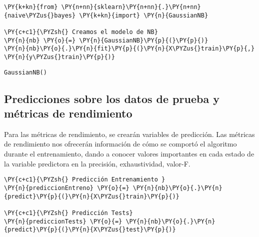    \begin{tcolorbox}[breakable, size=fbox, boxrule=1pt, pad at break*=1mm,colback=cellbackground, colframe=cellborder]
\begin{Verbatim}[commandchars=\\\{\}]
\PY{k+kn}{from} \PY{n+nn}{sklearn}\PY{n+nn}{.}\PY{n+nn}{naive\PYZus{}bayes} \PY{k+kn}{import} \PY{n}{GaussianNB}

\PY{c+c1}{\PYZsh{} Creamos el modelo de NB}
\PY{n}{nb} \PY{o}{=} \PY{n}{GaussianNB}\PY{p}{(}\PY{p}{)}
\PY{n}{nb}\PY{o}{.}\PY{n}{fit}\PY{p}{(}\PY{n}{X\PYZus{}train}\PY{p}{,} \PY{n}{y\PYZus{}train}\PY{p}{)}
\end{Verbatim}
\end{tcolorbox}

            \begin{tcolorbox}[breakable, size=fbox, boxrule=.5pt, pad at break*=1mm, opacityfill=0]
\begin{Verbatim}[commandchars=\\\{\}]
GaussianNB()
\end{Verbatim}
\end{tcolorbox}
        
    \hypertarget{predicciones-sobre-los-datos-de-prueba-y-muxe9tricas-de-rendimiento}{%
\subsection{Predicciones sobre los datos de prueba y métricas de rendimiento}\label{NB:predicciones-sobre-los-datos-de-prueba-y-muxe9tricas-de-rendimiento}}

	Para las métricas de rendimiento, se crearán variables de predicción. Las métricas de rendimiento nos ofrecerán información de cómo se comportó el algoritmo durante el entrenamiento, dando a conocer valores importantes en cada estado  de la variable predictora en la precisión, exhaustividad, valor-F.

    \begin{tcolorbox}[breakable, size=fbox, boxrule=1pt, pad at break*=1mm,colback=cellbackground, colframe=cellborder]
\begin{Verbatim}[commandchars=\\\{\}]
\PY{c+c1}{\PYZsh{} Predicción Entrenamiento }
\PY{n}{prediccionEntreno} \PY{o}{=} \PY{n}{nb}\PY{o}{.}\PY{n}{predict}\PY{p}{(}\PY{n}{X\PYZus{}train}\PY{p}{)}

\PY{c+c1}{\PYZsh{} Predicción Tests}
\PY{n}{prediccionTests} \PY{o}{=} \PY{n}{nb}\PY{o}{.}\PY{n}{predict}\PY{p}{(}\PY{n}{X\PYZus{}test}\PY{p}{)}
\end{Verbatim}
\end{tcolorbox}

